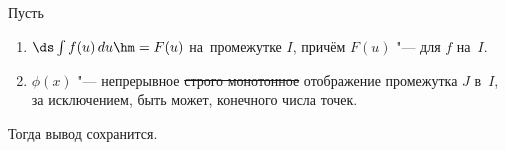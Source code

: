 \label{I2}
	Пусть \begin{enumerate}
	  \item $\ds\int f(u)\,du\hm=F(u)$ на~промежутке $I$, причём $F(u)$ "--- \tp{} для $f$ на~$I$.
	  \item $\phi(x)$ "--- непрерывное \sout{строго монотонное} отображение промежутка $J$ в~$I$, за исключением, быть может,
	  конечного числа точек.
	\end{enumerate}
	
	Тогда вывод сохранится.
